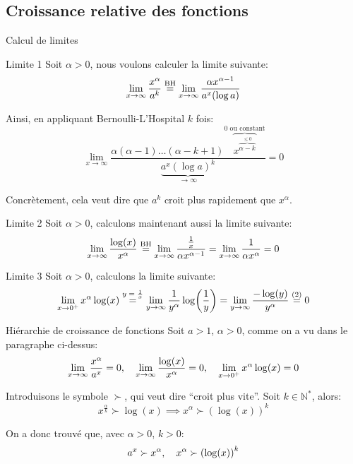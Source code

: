 \documentclass[a4paper]{article}
\begin{document}
\subsection{Croissance relative des fonctions}
\begin{parag}{Calcul de limites}
    \begin{subparag}{Limite 1}
        Soit $\alpha > 0$, nous voulons calculer la limite suivante:
        \[\lim_{x \to \infty} \frac{x^{\alpha}}{a^k} \over{=}{BH} \lim_{x \to \infty} \frac{\alpha x^{\alpha - 1}}{a^x\left(\log a\right)}\]

        Ainsi, en appliquant Bernoulli-L'Hospital $k$ fois:
        \[\lim_{x \to \infty} \frac{\alpha\left(\alpha - 1\right)\ldots\left(\alpha - k +1\right)\overbrace{x^{\overbrace{\alpha - k}^{\leq 0}}}^{0 \text{ ou constant}}}{\underbrace{a^x \left(\log a\right)^k}_{\to \infty}} = 0\]

        Concrètement, cela veut dire que $a^k$ croit plus rapidement que $x^{\alpha}$.
    \end{subparag}
    
    \begin{subparag}{Limite 2}
        Soit $\alpha > 0$, calculons maintenant aussi la limite suivante: 
        \[\lim_{x \to \infty} \frac{\log\left(x\right)}{x^{\alpha}} \over{=}{BH} \lim_{x \to \infty} \frac{\frac{1}{x}}{\alpha x^{\alpha - 1}} = \lim_{x \to \infty} \frac{1}{\alpha x^{\alpha}} = 0\]
    \end{subparag}
    
    \begin{subparag}{Limite 3}
        Soit $\alpha > 0$, calculons la limite suivante: 
        \[\lim_{x \to 0^+} x^{\alpha} \log\left(x\right) \over{=}{$y = \frac{1}{x}$} \lim_{y \to \infty} \frac{1}{y^{\alpha}} \log\left(\frac{1}{y}\right) = \lim_{y \to \infty} \frac{-\log\left(y\right)}{y^{\alpha}} \over{=}{(2)}  0\]
    \end{subparag}
\end{parag}

\begin{parag}{Hiérarchie de croissance de fonctions}
    Soit $a > 1$, $\alpha > 0$, comme on a vu dans le paragraphe ci-dessus:
    \[\lim_{x \to \infty} \frac{x^{\alpha}}{a^x} = 0, \mathspace \lim_{x \to \infty} \frac{\log\left(x\right)}{x^{\alpha}} = 0, \mathspace \lim_{x \to 0^+} x^{\alpha}\log\left(x\right) = 0\]
    
    Introduisons le symbole $\succ$, qui veut dire ``croit plus vite''. Soit $k \in\mathbb{N}^*$, alors: 
    \[x^{\frac{\alpha}{k}} \succ \log\left(x\right) \implies x^{\alpha} \succ \left(\log\left(x\right)\right)^k\]
    
    On a donc trouvé que, avec $\alpha > 0$, $k > 0$:
    \[a^x \succ x^{\alpha}, \mathspace x^{\alpha} \succ \left(\log\left(x\right)\right)^k\]
\end{parag}
\end{document}
